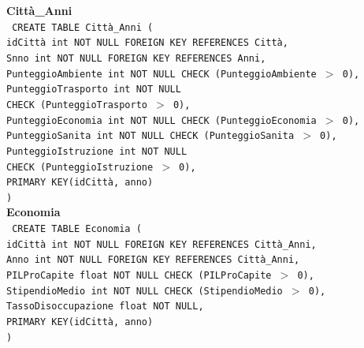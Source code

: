 \documentclass[a4paper,12pt]{report}
\begin{document}
                \noindent
                {\large \textbf{Città\_Anni}} \\
                \texttt{
                    CREATE TABLE Città\_Anni ( \\
                    \null\quad\quad idCittà int NOT NULL FOREIGN KEY REFERENCES Città, \\
                    \null\quad\quad Snno int NOT NULL FOREIGN KEY REFERENCES Anni, \\
                    \null\quad\quad PunteggioAmbiente       int     NOT NULL CHECK (PunteggioAmbiente $>$ 0), \\
                    \null\quad\quad PunteggioTrasporto      int     NOT NULL \\
                            \null\qquad\qquad CHECK (PunteggioTrasporto $>$ 0), \\
                    \null\quad\quad PunteggioEconomia       int     NOT NULL CHECK (PunteggioEconomia $>$ 0), \\
                    \null\quad\quad PunteggioSanita         int     NOT NULL CHECK (PunteggioSanita $>$ 0), \\
                    \null\quad\quad PunteggioIstruzione     int     NOT NULL \\
                            \null\qquad\qquad CHECK (PunteggioIstruzione $>$ 0), \\
                    \null\quad\quad PRIMARY KEY(idCittà, anno) \\
                    )
                } \\

                \noindent
                {\large \textbf{Economia}} \\
                \texttt{
                    CREATE TABLE Economia ( \\
                    \null\quad\quad idCittà int NOT NULL FOREIGN KEY REFERENCES Città\_Anni, \\
                    \null\quad\quad Anno int NOT NULL FOREIGN KEY REFERENCES Città\_Anni, \\
                    \null\quad\quad PILProCapite            float   NOT NULL CHECK (PILProCapite $>$ 0), \\
                    \null\quad\quad StipendioMedio          int     NOT NULL CHECK (StipendioMedio $>$ 0), \\
                    \null\quad\quad TassoDisoccupazione     float   NOT NULL, \\
                    \null\quad\quad PRIMARY KEY(idCittà, anno) \\
                    )
                } \\
\end{document}
